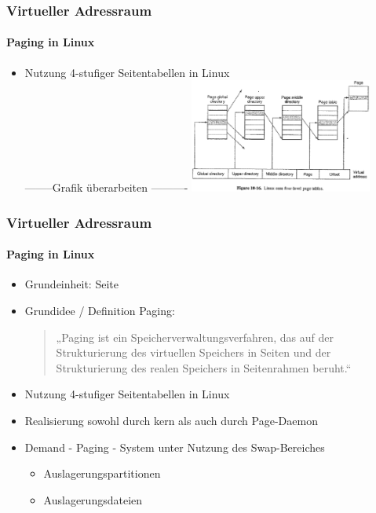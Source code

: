 \documentclass[ddcfooter,nosectionnum]{tudbeamer}
\begin{document}
\begin{frame}
    \frametitle{Virtueller Adressraum}
    \framesubtitle {Paging in Linux}
    \begin{itemize}
         \item Nutzung 4-stufiger Seitentabellen in Linux\\
         --------Grafik überarbeiten ----------
	\includegraphics[width=6cm]{Seitentab.eps} 		
    
    
     \end{itemize}
    
\end{frame}


\begin{frame}
 
    \frametitle {Virtueller Adressraum}
    
    \framesubtitle {Paging in Linux}
    \begin{itemize}
         \item  Grundeinheit: Seite
         \item Grundidee / Definition Paging: \\
        \begin{quote}
         „Paging ist ein Speicherverwaltungsverfahren, das auf der Strukturierung  des virtuellen Speichers 	in Seiten und der Strukturierung des realen Speichers in Seitenrahmen beruht.“
     	 \end{quote}
 	 \item Nutzung 4-stufiger Seitentabellen in Linux
	 \item Realisierung sowohl durch kern als auch durch Page-Daemon
	 \item Demand - Paging - System unter Nutzung des Swap-Bereiches
	 \begin{itemize}
	 	\item Auslagerungspartitionen 
		\item Auslagerungsdateien
	\end{itemize}
    
    
     \end{itemize}
    
\end{frame}
\end{document}
